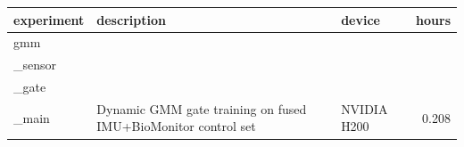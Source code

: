 \begin{tabular}{lllr}
\toprule
experiment & description & device & hours \\
\midrule
gmm\\_sensor\\_gate\\_main & Dynamic GMM gate training on fused IMU+BioMonitor control set & NVIDIA H200 & 0.208 \\
\bottomrule
\end{tabular}
